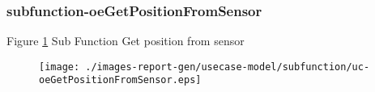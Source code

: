 \subsubsection{subfunction-oeGetPositionFromSensor}

\label{RE-use-case-oeGetPositionFromSensor}


Figure \ref{fig:lu.uni.lassy.excalibur.g01.specification-RE-UCD-uc-oeGetPositionFromSensor}
 Sub Function Get position from sensor 

\begin{figure}[htbp]
\begin{center}

\texttt{[image: ./images-report-gen/usecase-model/subfunction/uc-oeGetPositionFromSensor.eps]}
\end{center}
\caption[lu.uni.lassy.excalibur.g01.specification Use Case Diagram: uc-oeGetPositionFromSensor]{}
\label{fig:lu.uni.lassy.excalibur.g01.specification-RE-UCD-uc-oeGetPositionFromSensor}
\end{figure}
\vspace{0.5cm}
